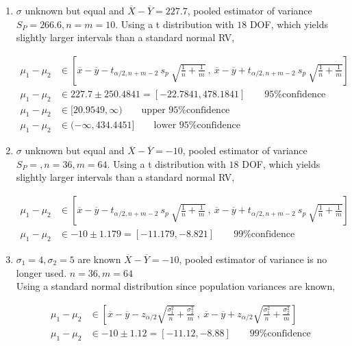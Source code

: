 \begin{enumerate}
	\item  $ \sigma $ unknown but equal and $ \overline{X} - \overline{Y} = 227.7 $, pooled estimator of variance $ S_P = 266.6, n = m = 10$.
	Using a t distribution with $ 18 $ DOF, which yields slightly larger intervals than a standard normal RV,
	
		\begin{align}
			\mu_1 - \mu_2 &\in \left[ \overline{x} - \overline{y} - t_{\alpha / 2, n+m-2}\ s_p\ \sqrt{\frac{1}{n} + \frac{1}{m}}\ ,\ \overline{x} - \overline{y} + t_{\alpha / 2, n+m-2}\ s_p\ \sqrt{\frac{1}{n} + \frac{1}{m}} \right]  \nonumber \\
			\mu_1 - \mu_2 &\in 227.7 \pm 250.4841 = [-22.7841, 478.1841] \qquad \text{95\% confidence}  \nonumber \\
			\mu_1 - \mu_2 &\in  [20.9549, \infty) \qquad \text{upper 95\% confidence} \nonumber \\
			\mu_1 - \mu_2 &\in  (-\infty, 434.4451] \qquad \text{lower 95\% confidence} \nonumber 
		\end{align}
	
	
	\item  $ \sigma $ unknown but equal and $ \overline{X} - \overline{Y} = -10 $, pooled estimator of variance $ S_P = , n = 36, m = 64$.
	Using a t distribution with $ 18 $ DOF, which yields slightly larger intervals than a standard normal RV,
	
		\begin{align}
			\mu_1 - \mu_2 &\in \left[ \overline{x} - \overline{y} - t_{\alpha / 2, n+m-2}\ s_p\ \sqrt{\frac{1}{n} + \frac{1}{m}}\ ,\ \overline{x} - \overline{y} + t_{\alpha / 2, n+m-2}\ s_p\ \sqrt{\frac{1}{n} + \frac{1}{m}} \right]  \nonumber \\
			\mu_1 - \mu_2 &\in -10 \pm 1.179 = [-11.179, -8.821] \qquad \text{99\% confidence}  
		\end{align}
	
	
	\item  $ \sigma_1 = 4, \sigma_2 = 5 $ are known  $ \overline{X} - \overline{Y} = -10 $, pooled estimator of variance is no longer used. $n = 36, m = 64$ \\
	Using a standard normal distribution since population variances are known,
	
		\begin{align}
			\mu_1 - \mu_2 &\in \left[ \overline{x} - \overline{y} - z_{\alpha / 2} \sqrt{\frac{\sigma_1^2}{n} + \frac{\sigma_2^2}{m}}\ ,\ \overline{x} - \overline{y} + z_{\alpha / 2} \sqrt{\frac{\sigma_1^2}{n} + \frac{\sigma_2^2}{m}} \right]   \nonumber \\
			\mu_1 - \mu_2 &\in -10 \pm 1.12 = [-11.12, -8.88] \qquad \text{99\% confidence}  
		\end{align}
	

\end{enumerate}
